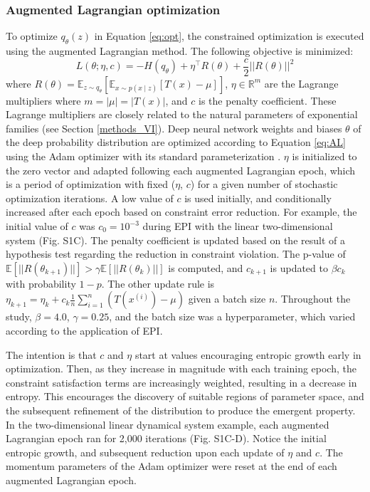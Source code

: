 \documentclass[11pt]{article}
\begin{document}
\subsubsection{Augmented Lagrangian optimization}\label{methods_AL_opt}
To optimize $q_\theta(z)$ in Equation \ref{eq:opt}, the constrained optimization is executed using the augmented Lagrangian method.  The following objective is minimized:
\begin{equation} \label{eq:AL}
L(\theta; \eta, c) = -H(q_\theta) + \eta^\top R(\theta) + \frac{c}{2}||R(\theta)||^2
\end{equation}
where $R(\theta) = \mathbb{E}_{z \sim q_\theta}\left[ \mathbb{E}_{x\sim p(x \mid z)}\left[T(x) - \mu \right] \right]$, $\eta \in \mathbb{R}^m$ are the Lagrange multipliers where $m = |\mu| = |T(x)|$,  and $c$ is the penalty coefficient. 
These Lagrange multipliers are closely related to the natural parameters of exponential families (see Section \ref{methods_VI}).
Deep neural network weights and biases $\theta$ of the deep probability distribution are optimized according to Equation \ref{eq:AL} using the Adam optimizer with its standard parameterization \cite{kingma2014adam}.
$\eta$ is initialized to the zero vector and adapted following each augmented Lagrangian epoch, which is a period of optimization with fixed ($\eta$, $c$) for a given number of stochastic optimization iterations. 
A low value of $c$ is used initially, and conditionally increased after each epoch based on constraint error reduction.
For example, the initial value of $c$ was $c_0 = 10^{-3}$ during EPI with the linear two-dimensional system (Fig. S1C).
The penalty coefficient is updated based on the result of a hypothesis test regarding the reduction in constraint violation.  
The p-value of $\mathbb{E}[||R(\theta_{k+1})||] > \gamma \mathbb{E} \left[||R(\theta_{k})|| \right]$ is computed, and $c_{k+1}$ is updated  to $\beta c_k$ with probability $1-p$.  
The other update rule is $\eta_{k+1} = \eta_k + c_k \frac{1}{n} \sum_{i=1}^n (T(x^{(i)}) - \mu)$ given a batch size $n$.
Throughout the study, $\beta = 4.0$, $\gamma = 0.25$, and the batch size was a hyperparameter, which varied according to the application of EPI.

The intention is that $c$ and $\eta$ start at values encouraging entropic growth early in optimization.  
Then, as they increase in magnitude with each training epoch, the constraint satisfaction terms are increasingly weighted, resulting in a decrease in entropy.
This encourages the discovery of suitable regions of parameter space, and the subsequent refinement of the distribution to produce the emergent property.
In the two-dimensional linear dynamical system example, each augmented Lagrangian epoch ran for 2,000 iterations (Fig. S1C-D).
Notice the initial entropic growth, and subsequent reduction upon each update of $\eta$ and $c$.
The momentum parameters of the Adam optimizer were reset at the end of each augmented Lagrangian epoch.
\end{document}
